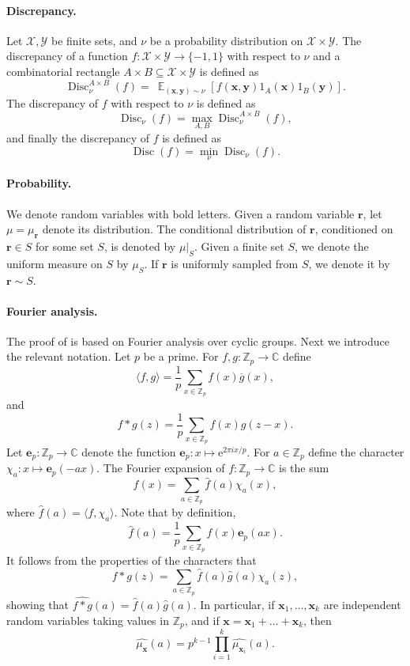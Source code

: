 \documentclass[11pt]{article}
\numberwithin{equation}{section}
\theoremstyle{definition}
\theoremstyle{plain}
\newcommand{\Z}{\mathbb Z}
\newcommand{\eee}{\mathrm e}
\theoremstyle{definition}\newtheorem{problem}[theorem]{Problem}\theoremstyle{plain}
\DeclareMathOperator{\Ex}{{\mathbb E}}
\DeclareMathOperator{\Disc}{Disc}
\newcommand{\e}{\mathbf{e}}
\newcommand{\x}{\mathbf{x}}
\newcommand{\y}{\mathbf{y}}
\newcommand{\Br}{\mathbf{r}}   %
\newcommand{\cX}{\mathcal{X}}
\newcommand{\cY}{\mathcal{Y}}
\newcommand{\ip}[1]{\langle #1 \rangle}
\begin{document}
\paragraph{Discrepancy.}
Let $\cX, \cY$ be finite sets, and  $\nu$ be a probability distribution on $\cX \times  \cY$.
The discrepancy of a function $f: \cX \times  \cY \to \{-1,1\}$ with respect to $\nu$ and a combinatorial rectangle $A \times B \subseteq \cX \times \cY$  is  defined as
$$\Disc^{A \times B}_\nu(f) = \ \Ex_{(\x,\y) \sim \nu}  \left[ f(\x,\y) 1_{A}(\x)1_B(\y) \right].$$
The discrepancy  of $f$ with respect to $\nu$ is defined as
$$\Disc_\nu(f)  = \max_{A ,B} \Disc^{A \times B}_\nu(f),$$
and finally the discrepancy of $f$ is defined as
$$\Disc(f) = \min_\nu \Disc_\nu(f).$$



\paragraph{Probability.}
We denote random variables with bold letters. Given a random variable $\Br$, let $\mu=\mu_{\Br}$ denote its distribution. The conditional distribution of $\Br$, conditioned on $\Br \in S$ for some set $S$, is denoted by $\mu|_{S}$. Given a finite set $S$, we denote the uniform measure on $S$ by $\mu_S$.
If $\Br$ is uniformly sampled from $S$, we denote it by $\Br \sim S$.


\paragraph{Fourier analysis.}
The proof of  is based on Fourier analysis over cyclic groups.
%
Next we introduce the relevant  notation.  %
Let $p$ be a prime. For $f,g: \Z_p \to \mathbb{C}$ define
$$\ip{f,g} = \frac{1}{p} \sum_{x \in \Z_p} f(x) \overline{g}(x),$$
and
$$f*g(z) = \frac{1}{p} \sum_{x\in \Z_p} f(x)g(z-x). $$
Let $\e_p: \Z_p \to \mathbb{C}$ denote the function 
$\e_p:x \mapsto \eee^{2\pi i x /p}$. For $a \in \Z_p$ define the character $\chi_a:x \mapsto \e_p(-ax)$. The Fourier expansion of $f:\Z_p \to \mathbb{C}$ is the sum
$$f(x) = \sum_{{a\in \Z_p}} \widehat{f}(a) \chi_a(x),$$
where $\widehat{f}(a)= \ip{f, \chi_a}$. Note that by definition, $$\widehat{f}(a)=\frac{1}{p} \sum_{x \in \Z_p} f(x) \e_p(ax).$$
It follows from the properties of the characters that
$$f*g(z) = \sum_{{a\in \Z_p}} \widehat{f}(a)\widehat{g}(a) \chi_a(z),$$
showing that $\widehat{f*g}(a)= \widehat{f}(a)\widehat{g}(a)$. In particular, if $\x_1,\ldots,\x_k$ are independent random variables
taking values in $\Z_p$, and if $\x=\x_1+\ldots+\x_k$, then
$$
\widehat{\mu_{\x}}(a) = p^{k-1} \prod_{i=1}^k \widehat{\mu_{\x_i}}(a).
$$
\end{document}
